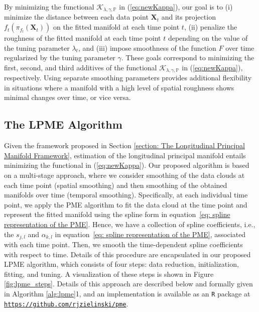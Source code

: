 \documentclass[12pt]{article}
\newcommand{\blind}{1}
\theoremstyle{definition}
\begin{document}
 By minimizing the functional $\mathcal{K}_{\lambda, \gamma, \mathbb{P}}$ in (\ref{eq:newKappa}), our goal is to (i) minimize the distance between each data point $\mathbf{X}_t$ and its projection $f_t\left(\pi_{f_t}(\mathbf{X}_t)\right)$ on the fitted manifold at each time point $t$, (ii) penalize the roughness of the fitted manifold at each time point $t$ depending on the value of the tuning parameter $\lambda_t$, and (iii) impose smoothness of the function $F$ over time regularized by the tuning parameter $\gamma$. These goals correspond to minimizing the first, second, and third additives of the functional $\mathcal{K}_{\lambda, \gamma, \mathbb{P}}$ in (\ref{eq:newKappa}), respectively.   Using separate smoothing parameters provides additional flexibility in situations where a manifold with a high level of spatial roughness shows minimal changes over time, or vice versa. 



\subsection{The LPME Algorithm}

Given the framework proposed in Section \ref{section: The Longitudinal Principal Manifold Framework}, estimation of the longitudinal principal manifold entails minimizing the functional in (\ref{eq:newKappa}). Our proposed algorithm is based on a multi-stage approach, where we consider smoothing of the data clouds at each time point (spatial smoothing) and then smoothing of the obtained manifolds over time (temporal smoothing). Specifically, at each individual time point, we apply the PME algorithm \citep[alg. 2]{meng2021Principal} to fit the data cloud at the time point and represent the fitted manifold using the spline form in equation~\eqref{eq: spline representation of the PME}. Hence, we have a collection of spline coefficients, i.e., the $s_{j,l}$ and $\alpha_{k,l}$ in equation~\eqref{eq: spline representation of the PME}, associated with each time point. Then, we smooth the time-dependent spline coefficients with respect to time. Details of this procedure are encapsulated in our proposed LPME algorithm, which consists of four steps: data reduction, initialization, fitting, and tuning. A visualization of these steps is shown in Figure \ref{fig:lpme_steps}. Details of this approach are described below and formally given in Algorithm \ref{alg:lpme}\blind{, and an implementation is available as an \texttt{R} package at \href{https://github.com/rjzielinski/pme}{\texttt{https://github.com/rjzielinski/pme}}}\fi.
\end{document}
